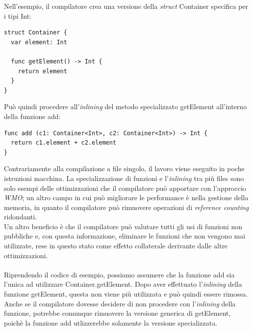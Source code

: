 Nell'esempio, il compilatore crea una versione della \textit{struct} Container specifica per i tipi Int: 
\begin{lstlisting}
struct Container {
  var element: Int

  func getElement() -> Int {
    return element
  }
}
\end{lstlisting}
Può quindi procedere all'\textit{inlining} del metodo specializzato getElement all'interno della funzione add:
\begin{lstlisting}
func add (c1: Container<Int>, c2: Container<Int>) -> Int {
  return c1.element + c2.element
}
\end{lstlisting}
Contrariamente alla compilazione a file singolo, il lavoro viene eseguito in poche istruzioni macchina. La specializzazione di funzioni e l'\textit{inlining} tra più files sono solo esempi delle ottimizzazioni che il compilatore può apportare con l'approccio \textit{WMO}; un altro campo in cui può migliorare le performance è nella gestione della memoria, in quanto il compilatore può rimuovere operazioni di \textit{reference counting} ridondanti.\\
Un altro beneficio è che il compilatore può valutare tutti gli usi di funzioni non pubbliche e, con questa informazione, eliminare le funzioni che non vengono mai utilizzate, rese in questo stato come effetto collaterale derivante dalle altre ottimizzazioni.\\\\Riprendendo il codice di esempio, possiamo assumere che la funzione add sia l'unica ad utilizzare Container.getElement. Dopo aver effettuato l'\textit{inlining} della funzione getElement, questa non viene più utilizzata e può quindi essere rimossa. Anche se il compilatore dovesse decidere di non procedere con l'\textit{inlining} della funzione, potrebbe comunque rimuovere la versione generica di getElement, poichè la funzione add utlizzerebbe solamente la versione specializzata.
